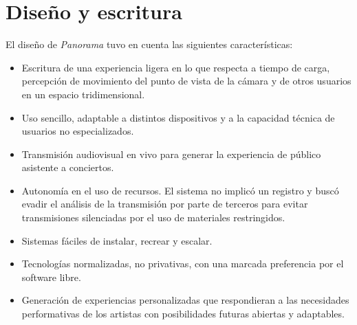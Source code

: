 
\section*{Diseño y escritura} %

\color{BlueGreen}


\color{black}

El diseño de \textit{Panorama} tuvo en cuenta las siguientes características:

\begin{itemize}
\item Escritura de una experiencia ligera en lo que respecta a tiempo de carga, percepción de movimiento del punto de vista de la cámara y de otros usuarios en un espacio tridimensional.  
\item Uso sencillo, adaptable a distintos dispositivos y a la capacidad técnica de usuarios no especializados.
\item Transmisión audiovisual en vivo para generar la experiencia de público asistente a conciertos. 
\item Autonomía en el uso de recursos. El sistema no implicó un registro y buscó evadir el análisis de la transmisión por parte de terceros para evitar transmisiones silenciadas por el uso de materiales restringidos. %
\item Sistemas fáciles de instalar, recrear y escalar.
\item Tecnologías normalizadas, no privativas, con una marcada preferencia por el software libre.
\item Generación de experiencias personalizadas que respondieran a las necesidades performativas de los artistas con posibilidades futuras abiertas y adaptables. 
\end{itemize}

